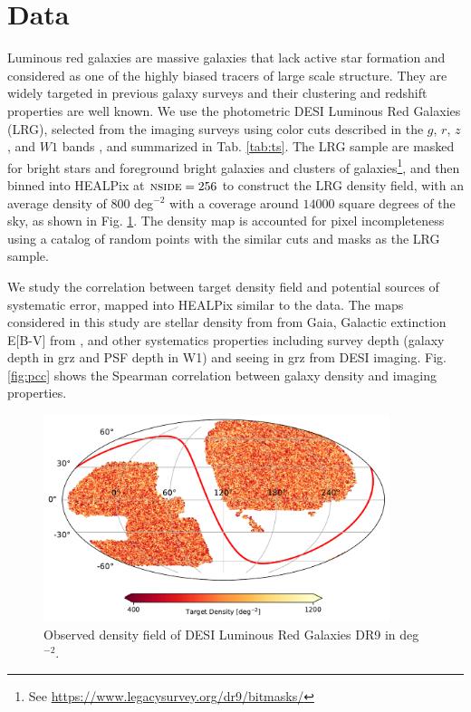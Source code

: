 \section{Data}
\label{sec:data}
Luminous red galaxies are massive galaxies that lack active star formation and considered as one of the highly biased tracers of large scale structure. They are widely targeted in previous galaxy surveys and their clustering and redshift properties are well known. We use the photometric DESI Luminous Red Galaxies (LRG), selected from the imaging surveys \citep{dey2018overview} using color cuts described in the $g$, $r$, $z$, and $W1$ bands \citep[see,][]{zhou2021clustering}, and summarized in Tab. \ref{tab:ts}. The LRG sample are masked for bright stars and foreground bright galaxies and clusters of galaxies\footnote{See \url{https://www.legacysurvey.org/dr9/bitmasks/}}, and then binned into HEALPix \citep{gorski2005healpix} at $\textsc{nside}=256$ to construct the LRG density field, with an average density of $800$ deg$^{-2}$ with a coverage around $14000$ square degrees of the sky, as shown in Fig. \ref{fig:ng}. The density map is accounted for pixel incompleteness using a catalog of random points with the similar cuts and masks as the LRG sample. 

We study the correlation between target density field and potential sources of systematic error, mapped into HEALPix similar to the data. The maps considered in this study are stellar density from  from Gaia,  Galactic extinction E[B-V] from \cite{schlegel1998maps}, and other systematics properties including survey depth (galaxy depth in grz and PSF depth in W1) and seeing in grz from DESI imaging. Fig. \ref{fig:pcc} shows the Spearman correlation between galaxy density and imaging properties. 


\begin{figure}
    \centering
    \includegraphics[width=0.9\textwidth]{figures/lrgdens.pdf}
    \caption{Observed density field of DESI Luminous Red Galaxies DR9 in deg$^{-2}$.}
    \label{fig:ng}
\end{figure}


